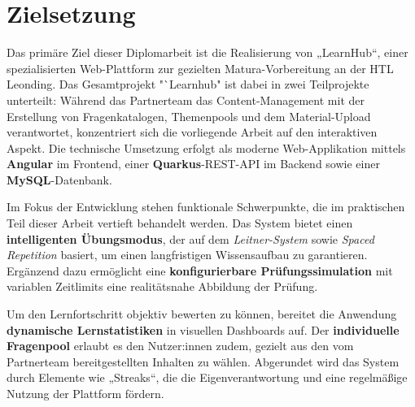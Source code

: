 
\section{Zielsetzung}

Das primäre Ziel dieser Diplomarbeit ist die Realisierung von „LearnHub“, einer spezialisierten Web-Plattform zur gezielten Matura-Vorbereitung an der HTL Leonding. Das Gesamtprojekt "`Learnhub"  ist dabei in zwei Teilprojekte unterteilt: Während das Partnerteam das Content-Management mit der Erstellung von Fragenkatalogen, Themenpools und dem Material-Upload verantwortet, konzentriert sich die vorliegende Arbeit auf den interaktiven Aspekt. Die technische Umsetzung erfolgt als moderne Web-Applikation mittels \textbf{Angular} im Frontend, einer \textbf{Quarkus}-REST-API im Backend sowie einer \textbf{MySQL}-Datenbank.

Im Fokus der Entwicklung stehen funktionale Schwerpunkte, die im praktischen Teil dieser Arbeit vertieft behandelt werden. Das System bietet einen \textbf{intelligenten Übungsmodus}, der auf dem \textit{Leitner-System} sowie \textit{Spaced Repetition} basiert, um einen langfristigen Wissensaufbau zu garantieren. Ergänzend dazu ermöglicht eine \textbf{konfigurierbare Prüfungssimulation} mit variablen Zeitlimits eine realitätsnahe Abbildung der Prüfung. 

Um den Lernfortschritt objektiv bewerten zu können, bereitet die Anwendung \textbf{dynamische Lernstatistiken} in visuellen Dashboards auf. Der \textbf{individuelle Fragenpool} erlaubt es den Nutzer:innen zudem, gezielt aus den vom Partnerteam bereitgestellten Inhalten zu wählen. Abgerundet wird das System durch Elemente wie „Streaks“, die die Eigenverantwortung und eine regelmäßige Nutzung der Plattform fördern.